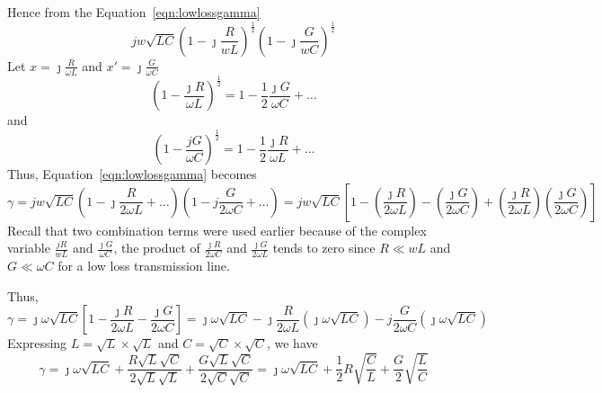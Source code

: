 Hence from the Equation~\ref{eqn:lowlossgamma}
\[jw\sqrt{LC}\left(1 - \jmath\frac{R}{wL}\right)^{\frac{1}{2}}\left(1 - \jmath\frac{G}{wC}\right)^{\frac{1}{2}}\]
Let $x = \jmath\frac{R}{\omega L}$ and $x' = \jmath\frac{G}{\omega C}$
\begin{dmath*}
\left(1 - \frac{\jmath R}{\omega L}\right)^{\frac{1}{2}} = 1 - \frac{1}{2}\frac{\jmath G}{\omega C} + \ldots
\end{dmath*}
and
\begin{dmath*}
\left(1 - \frac{jG}{\omega C}\right)^{\frac{1}{2}} = 1 - \frac{1}{2}\frac{\jmath R}{\omega L} + \ldots 
\end{dmath*}
Thus, Equation~\ref{eqn:lowlossgamma} becomes
\begin{dmath*}
\gamma = jw\sqrt{LC}\left(1 - \jmath \frac{R}{2\omega L} + \ldots\right)\left(1 - j\frac{G}{2\omega C} + \ldots\right) = jw\sqrt{LC} \left[1- \left(\frac{\jmath R}{2\omega L}\right) - \left(\frac{\jmath G}{2\omega C}\right) + \left(\frac{\jmath R}{2\omega L}\right)\left(\frac{\jmath G}{2\omega C}\right)\right]
\end{dmath*}
Recall that two combination terms were used earlier because of the complex variable $\frac{jR}{wL}$ and $\frac{\jmath G}{\omega C}$, the product of $\frac{\jmath R}{2\omega C}$ and $\frac{\jmath G}{2\omega L}$ tends to zero since $R \ll wL$ and $G \ll \omega C$ for a low loss transmission line.

Thus,
\begin{dmath}    
\gamma = \jmath\omega\sqrt{LC} \left[1- \frac{\jmath R}{2\omega L} - \frac{\jmath G}{2\omega C}\right] = \jmath\omega\sqrt{LC} - \jmath\frac{R}{2\omega L}\left(\jmath\omega\sqrt{LC}\right) - j\frac{G}{2\omega C}\left(\jmath\omega\sqrt{LC}\right)
\end{dmath}
Expressing $L = \sqrt{L} \times \sqrt{L}$ and $C = \sqrt{C} \times \sqrt{C}$, we have
\begin{dmath*}
\gamma = \jmath\omega\sqrt{LC} + \frac{R\sqrt{L}\sqrt{C}}{2\sqrt{L}\sqrt{L}} + \frac{G\sqrt{L}\sqrt{C}}{2\sqrt{C}\sqrt{C}} = \jmath\omega\sqrt{LC} + \frac{1}{2}R\sqrt{\frac{C}{L}} + \frac{G}{2}\sqrt{\frac{L}{C}} 
\end{dmath*}

